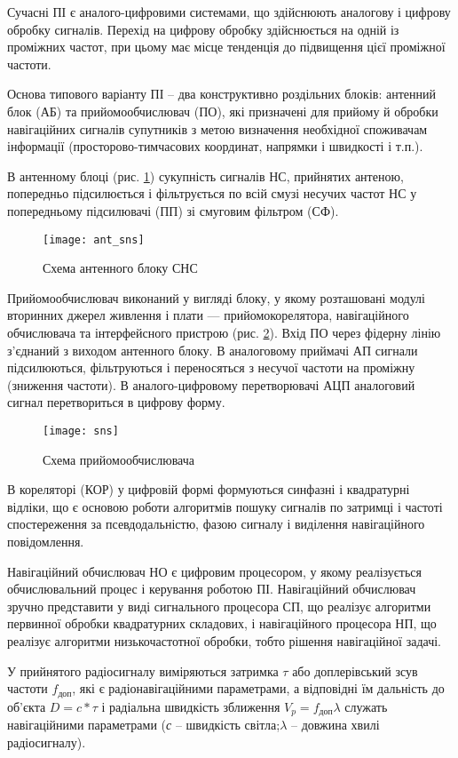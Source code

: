 Сучасні ПІ є аналого-цифровими системами, що здійснюють аналогову і цифрову обробку 
сигналів. Перехід на цифрову обробку здійснюється на одній із проміжних частот, при 
цьому має місце тенденція до підвищення цієї проміжної частоти.

Основа типового варіанту ПІ -- два конструктивно роздільних блоків: антенний блок (АБ) та 
прийомообчислювач (ПО), які призначені для прийому й обробки навігаційних сигналів 
супутників з метою визначення необхідної споживачам інформації (просторово-тимчасових 
координат, напрямки і швидкості і т.п.).

В антенному блоці (рис. \ref{fig:ant_sns}) сукупність сигналів НС, прийнятих антеною, попередньо 
підсилюється і фільтрується по всій смузі несучих частот НС у попередньому підсилювачі 
(ПП) зі смуговим фільтром (СФ). 
\begin{figure}[here]
\centering
\texttt{[image: ant\_sns]}
\caption{Схема антенного блоку СНС}
\label{fig:ant_sns}
\end{figure} 

Прийомообчислювач виконаний у вигляді блоку, у якому розташовані модулі вторинних 
джерел живлення і плати --- прийомокорелятора, навігаційного обчислювача та інтерфейсного 
пристрою (рис. \ref{fig:sns}). Вхід ПО через фідерну лінію з'єднаний з виходом антенного блоку. 
В аналоговому приймачі АП сигнали підсилюються, фільтруються і переносяться з несучої 
частоти на проміжну (зниження частоти). В аналого-цифровому перетворювачі АЦП аналоговий 
сигнал перетвориться в цифрову форму.
\begin{figure}[here]
\centering
\texttt{[image: sns]}
\caption{Схема прийомообчислювача}
\label{fig:sns}
\end{figure} 
В кореляторі (КОР) у цифровій формі формуються синфазні  і квадратурні  відліки, що є 
основою роботи алгоритмів пошуку сигналів по затримці і частоті спостереження за псевдодальністю, 
фазою сигналу і виділення навігаційного повідомлення.

Навігаційний обчислювач НО є цифровим процесором, у якому реалізується обчислювальний процес 
і керування роботою ПІ. Навігаційний обчислювач зручно представити у виді сигнального процесора 
СП, що реалізує алгоритми первинної обробки квадратурних складових, і навігаційного процесора 
НП, що реалізує алгоритми низькочастотної обробки, тобто рішення навігаційної задачі.

У прийнятого радіосигналу виміряються затримка $\tau$ або доплерівський зсув частоти $f_{\text{доп}}$, 
які є радіонавігаційними параметрами, а відповідні їм дальність до об'єкта $D=c*\tau$  
і радіальна швидкість зближення $V_{p}=f_{\text{доп}}\lambda$   служать навігаційними параметрами 
(\textit{с } -- швидкість світла;$\lambda$ -- довжина хвилі радіосигналу).

